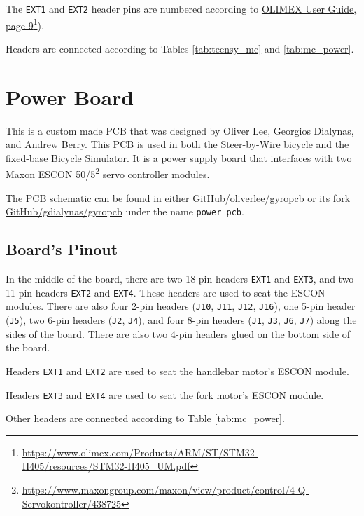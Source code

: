 The \verb|EXT1| and \verb|EXT2| header pins are numbered according to \href{https://www.olimex.com/Products/ARM/ST/STM32-H405/resources/STM32-H405_UM.pdf}{OLIMEX User Guide, page 9}\footnote{\href{https://www.olimex.com/Products/ARM/ST/STM32-H405/resources/STM32-H405_UM.pdf}{https://www.olimex.com/Products/ARM/ST/STM32-H405/resources/STM32-H405\_UM.pdf}}).

Headers are connected according to Tables \ref{tab:teensy_mc} and \ref{tab:mc_power}.


\section{Power Board}
This is a custom made PCB that was designed by Oliver Lee, Georgios Dialynas, and Andrew Berry. This PCB is used in both the Steer-by-Wire bicycle and the fixed-base Bicycle Simulator. It is a power supply board that interfaces with two \href{https://www.maxongroup.com/maxon/view/product/control/4-Q-Servokontroller/438725}{Maxon ESCON 50/5}\footnote{\href{https://www.maxongroup.com/maxon/view/product/control/4-Q-Servokontroller/438725}{https://www.maxongroup.com/maxon/view/product/control/4-Q-Servokontroller/438725}} servo controller modules.

The PCB schematic can be found in either \href{https://github.com/oliverlee/gyropcb}{GitHub/oliverlee/gyropcb} or its fork \href{https://github.com/gdialynas/gyropcb}{GitHub/gdialynas/gyropcb} under the name \verb|power_pcb|.

\subsection{Board's Pinout}
In the middle of the board, there are two 18-pin headers \verb|EXT1| and \verb|EXT3|, and two 11-pin headers \verb|EXT2| and \verb|EXT4|. These headers are used to seat the ESCON modules. There are also four 2-pin headers (\verb|J10|, \verb|J11|, \verb|J12|, \verb|J16|), one 5-pin header (\verb|J5|), two 6-pin headers (\verb|J2|, \verb|J4|), and four 8-pin headers (\verb|J1|, \verb|J3|, \verb|J6|, \verb|J7|) along the sides of the board. There are also two 4-pin headers glued on the bottom side of the board.

Headers \verb|EXT1| and \verb|EXT2| are used to seat the handlebar motor's ESCON module.

Headers \verb|EXT3| and \verb|EXT4| are used to seat the fork motor's ESCON module.

Other headers are connected according to Table \ref{tab:mc_power}.

